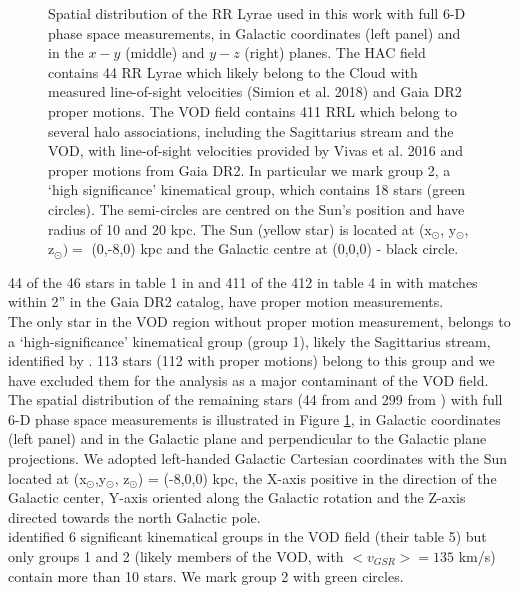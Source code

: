 \documentclass[fleqn,usenatbib]{mnras}
\begin{document}
\begin{figure}
    \caption{Spatial distribution of the RR Lyrae used in this work with full 6-D phase space measurements, in Galactic coordinates (left panel) and in the $x-y$ (middle) and $y-z$ (right) planes.  The HAC field contains 44 RR Lyrae which likely belong to the Cloud with measured line-of-sight  velocities (Simion et al. 2018) and  Gaia DR2 proper motions. The VOD field contains 411 RRL which belong to several halo associations, including the Sagittarius stream and the VOD, with line-of-sight velocities provided by Vivas et al. 2016 and proper motions from Gaia DR2. In particular we mark group 2, a `high significance' kinematical group, which contains 18 stars (green circles). The semi-circles are centred on the Sun's position and have radius of 10 and 20 kpc. The Sun (yellow star) is located at (x$_{\odot}$, y$_{\odot}$, z$_{\odot})= $ (0,-8,0) kpc and the Galactic centre at (0,0,0) - black circle.  }
    \label{fig:lb}
\end{figure}
%
44 of the 46 stars in table 1 in \cite{Simion2018} and 411 of the 412 in table 4 in \cite{Vivas2016} with matches within 2'' in the Gaia DR2 catalog, have proper motion measurements. \\ 
The only star in the VOD region without proper motion measurement, belongs to a `high-significance' kinematical group (group 1), likely the Sagittarius stream, identified by \cite{Vivas2016}. 113 stars (112 with proper motions) belong to this group and we have excluded them for the analysis as a major contaminant of the VOD field. The spatial distribution of the remaining stars (44 from \citealt{Simion2018} and 299 from \citealt{Vivas2016}) with full 6-D phase space measurements is illustrated in Figure \ref{fig:lb}, in Galactic coordinates (left panel) and in the Galactic plane and perpendicular to the Galactic plane projections. We adopted left-handed Galactic Cartesian coordinates with the Sun located at (x$_{\odot}$,y$_{\odot}$, z$_{\odot}$) = (-8,0,0) kpc, the X-axis positive in the direction of the Galactic center, Y-axis oriented along the Galactic rotation and the Z-axis directed towards the north Galactic pole.\\
\citealt{Vivas2016} identified 6 significant kinematical groups in the VOD field (their table 5) but only groups 1 and 2 (likely members of the VOD, with $<v_{GSR}>= 135$ km/s) contain more than 10 stars. We mark group 2 with green circles. 
%
%
%
\end{document}
